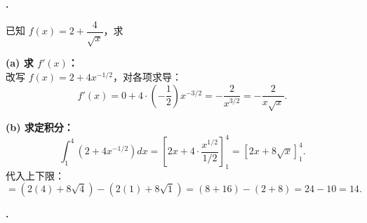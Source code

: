 \documentclass[12pt,a4paper]{ctexart}
\newcounter{qnum}
\newenvironment{question}
  {%
    \stepcounter{qnum}%
    \vspace{0.8em}%
    \noindent\textbf{\theqnum.}\enspace
  }
  {\par\vspace{0.4em}}
\newenvironment{solution}
  {%
    \par\noindent
  }
  {\par}
\begin{document}
\begin{question}
    已知 $f(x) = 2 + \dfrac{4}{\sqrt{x}}$，求
\end{question}

\begin{solution}
    \textbf{(a) 求 $f'(x)$：} \\
    改写 $f(x) = 2 + 4x^{-1/2}$，对各项求导：
    \[
        f'(x) = 0 + 4 \cdot \left(-\frac{1}{2}\right)x^{-3/2} = -\frac{2}{x^{3/2}} = -\frac{2}{x\sqrt{x}}.
    \]

    \textbf{(b) 求定积分：} \\
    \[
        \int_1^4 \!\left(2 + 4x^{-1/2}\right)dx
        = \left[2x + 4 \cdot \frac{x^{1/2}}{1/2}\right]_1^4
        = \left[2x + 8\sqrt{x}\right]_1^4.
    \]
    代入上下限：
    \[
        = \left(2(4) + 8\sqrt{4}\right) - \left(2(1) + 8\sqrt{1}\right)
        = (8 + 16) - (2 + 8)
        = 24 - 10 = 14.
    \]
\end{solution}


\begin{question}
\end{question}
\end{document}
